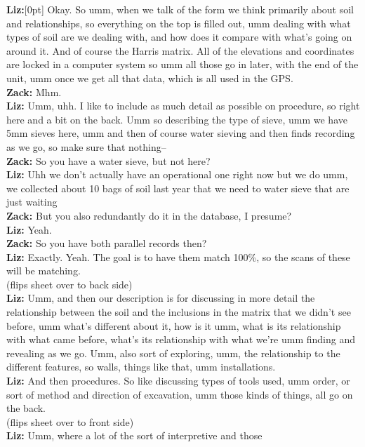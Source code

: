 \documentclass[
]{article}
\newcommand{\paragraphnumber}[1]{\marginnote{\color{lightgray}\tiny{#1}}[0pt]}
\begin{document}
\textbf{Liz:}\paragraphnumber{[122]} Okay. So umm, when we talk of the
form we think primarily about soil and relationships, so everything on
the top is filled out, umm dealing with what types of soil are we
dealing with, and how does it compare with what's going on around it.
And of course the Harris matrix. All of the elevations and coordinates
are locked in a computer system so umm all those go in later, with the
end of the unit, umm once we get all that data, which is all used in the
GPS.\\
\textbf{Zack:} Mhm.\\
\textbf{Liz:} Umm, uhh. I like to include as much detail as possible on
procedure, so right here and a bit on the back. Umm so describing the
type of sieve, umm we have 5mm sieves here, umm and then of course water
sieving and then finds recording as we go, so make sure that nothing--\\
\textbf{Zack:} So you have a water sieve, but not here?\\
\textbf{Liz:} Uhh we don't actually have an operational one right now
but we do umm, we collected about 10 bags of soil last year that we need
to water sieve that are just waiting\\
\textbf{Zack:} But you also redundantly do it in the database, I
presume?\\
\textbf{Liz:} Yeah.\\
\textbf{Zack:} So you have both parallel records then?\\
\textbf{Liz:} Exactly. Yeah. The goal is to have them match 100\%, so
the scans of these will be matching.\\
(flips sheet over to back side)\\
\textbf{Liz:} Umm, and then our description is for discussing in more
detail the relationship between the soil and the inclusions in the
matrix that we didn't see before, umm what's different about it, how is
it umm, what is its relationship with what came before, what's its
relationship with what we're umm finding and revealing as we go. Umm,
also sort of exploring, umm, the relationship to the different features,
so walls, things like that, umm installations.\\
\textbf{Liz:} And then procedures. So like discussing types of tools
used, umm order, or sort of method and direction of excavation, umm
those kinds of things, all go on the back.\\
(flips sheet over to front side)\\
\textbf{Liz:} Umm, where a lot of the sort of interpretive and those
\end{document}
